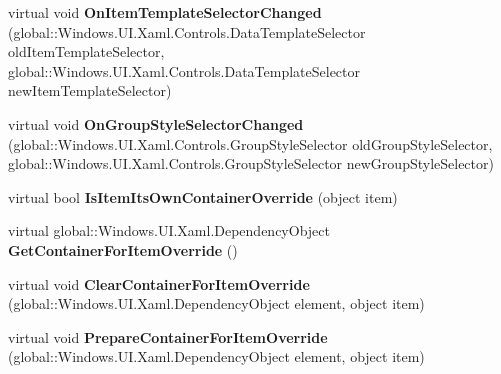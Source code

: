 \begin{DoxyCompactItemize}
\item 
\mbox{\label{class_windows_1_1_u_i_1_1_xaml_1_1_controls_1_1_items_control_af6a143834a45fdc2422edde6c8dbe3dd}} 
virtual void {\bfseries On\+Item\+Template\+Selector\+Changed} (global\+::\+Windows.\+U\+I.\+Xaml.\+Controls.\+Data\+Template\+Selector old\+Item\+Template\+Selector, global\+::\+Windows.\+U\+I.\+Xaml.\+Controls.\+Data\+Template\+Selector new\+Item\+Template\+Selector)
\item 
\mbox{\label{class_windows_1_1_u_i_1_1_xaml_1_1_controls_1_1_items_control_adea6b7c5dc22e6a94522e632340290be}} 
virtual void {\bfseries On\+Group\+Style\+Selector\+Changed} (global\+::\+Windows.\+U\+I.\+Xaml.\+Controls.\+Group\+Style\+Selector old\+Group\+Style\+Selector, global\+::\+Windows.\+U\+I.\+Xaml.\+Controls.\+Group\+Style\+Selector new\+Group\+Style\+Selector)
\item 
\mbox{\label{class_windows_1_1_u_i_1_1_xaml_1_1_controls_1_1_items_control_af7c44086f992202e12f3559064216061}} 
virtual bool {\bfseries Is\+Item\+Its\+Own\+Container\+Override} (object item)
\item 
\mbox{\label{class_windows_1_1_u_i_1_1_xaml_1_1_controls_1_1_items_control_a77205f1b95f23b7eac70cb06025fade2}} 
virtual global\+::\+Windows.\+U\+I.\+Xaml.\+Dependency\+Object {\bfseries Get\+Container\+For\+Item\+Override} ()
\item 
\mbox{\label{class_windows_1_1_u_i_1_1_xaml_1_1_controls_1_1_items_control_af3c1217d5a48fec76e474ba4bf48a67a}} 
virtual void {\bfseries Clear\+Container\+For\+Item\+Override} (global\+::\+Windows.\+U\+I.\+Xaml.\+Dependency\+Object element, object item)
\item 
\mbox{\label{class_windows_1_1_u_i_1_1_xaml_1_1_controls_1_1_items_control_ab41bdb021d690e9fd35d99c8455e58cf}} 
virtual void {\bfseries Prepare\+Container\+For\+Item\+Override} (global\+::\+Windows.\+U\+I.\+Xaml.\+Dependency\+Object element, object item)

\end{DoxyCompactItemize}
